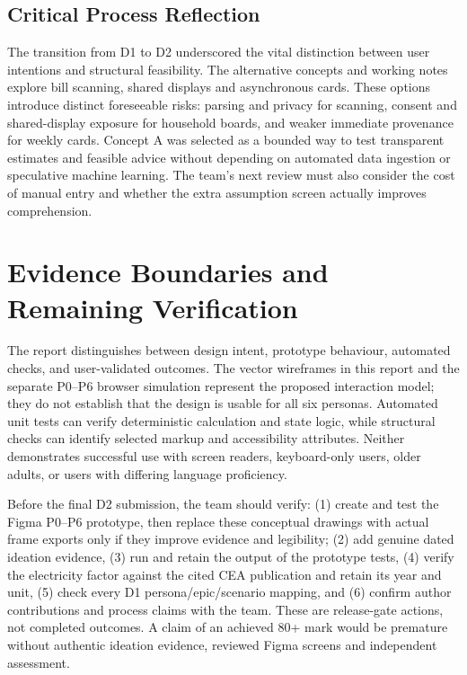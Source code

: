 \documentclass[12pt,a4paper]{article}
\begin{document}
\subsection{Critical Process Reflection}
The transition from D1 to D2 underscored the vital distinction between user intentions and structural feasibility. The alternative concepts and working notes explore bill scanning, shared displays and asynchronous cards. These options introduce distinct foreseeable risks: parsing and privacy for scanning, consent and shared-display exposure for household boards, and weaker immediate provenance for weekly cards. Concept A was selected as a bounded way to test transparent estimates and feasible advice without depending on automated data ingestion or speculative machine learning. The team's next review must also consider the cost of manual entry and whether the extra assumption screen actually improves comprehension.

\section{Evidence Boundaries and Remaining Verification}

The report distinguishes between design intent, prototype behaviour, automated checks, and user-validated outcomes. The vector wireframes in this report and the separate P0--P6 browser simulation represent the proposed interaction model; they do not establish that the design is usable for all six personas. Automated unit tests can verify deterministic calculation and state logic, while structural checks can identify selected markup and accessibility attributes. Neither demonstrates successful use with screen readers, keyboard-only users, older adults, or users with differing language proficiency.

Before the final D2 submission, the team should verify: (1) create and test the Figma P0--P6 prototype, then replace these conceptual drawings with actual frame exports only if they improve evidence and legibility; (2) add genuine dated ideation evidence, (3) run and retain the output of the prototype tests, (4) verify the electricity factor against the cited CEA publication and retain its year and unit, (5) check every D1 persona/epic/scenario mapping, and (6) confirm author contributions and process claims with the team. These are release-gate actions, not completed outcomes. A claim of an achieved 80+ mark would be premature without authentic ideation evidence, reviewed Figma screens and independent assessment.
\end{document}
